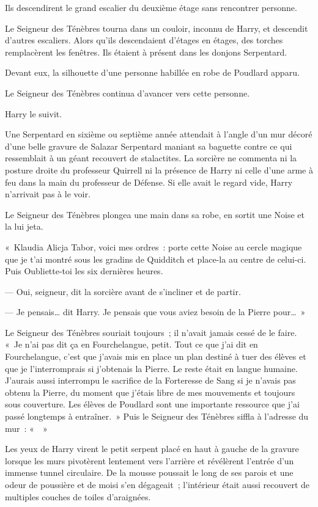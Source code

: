 Ils descendirent le grand escalier du deuxième étage sans rencontrer personne.

Le Seigneur des Ténèbres tourna dans un couloir, inconnu de Harry, et descendit d'autres escaliers.
Alors qu'ils descendaient d'étages en étages, des torches remplacèrent les fenêtres.
Ils étaient à présent dans les donjons Serpentard.

Devant eux, la silhouette d'une personne habillée en robe de Poudlard apparu.

Le Seigneur des Ténèbres continua d'avancer vers cette personne.

Harry le suivit.

Une Serpentard en sixième ou septième année attendait à l'angle d'un mur décoré d'une belle gravure de Salazar Serpentard maniant sa baguette contre ce qui ressemblait à un géant recouvert de stalactites.
La sorcière ne commenta ni la posture droite du professeur Quirrell ni la présence de Harry ni celle d'une arme à feu dans la main du professeur de Défense.
Si elle avait le regard vide, Harry n'arrivait pas à le voir.

Le Seigneur des Ténèbres plongea une main dans sa robe, en sortit une Noise et la lui jeta.

«~Klaudia Alicja Tabor, voici mes ordres~: porte cette Noise au cercle magique que je t'ai montré sous les gradins de Quidditch et place-la au centre de celui-ci.
Puis Oubliette-toi les six dernières heures.

--- Oui, seigneur, dit la sorcière avant de s'incliner et de partir.

--- Je pensais… dit Harry.
Je pensais que vous aviez besoin de la Pierre pour…~»

Le Seigneur des Ténèbres souriait toujours~; il n'avait jamais cessé de le faire.
«~Je n'ai pas dit ça en Fourchelangue, petit.
Tout ce que j'ai dit en Fourchelangue, c'est que j'avais mis en place un plan destiné à tuer des élèves et que je l'interromprais si j'obtenais la Pierre.
Le reste était en langue humaine.
J'aurais aussi interrompu le sacrifice de la Forteresse de Sang si je n'avais pas obtenu la Pierre, du moment que j'étais libre de mes mouvements et toujours sous couverture.
Les élèves de Poudlard sont une importante ressource que j'ai passé longtemps à entraîner.~»
Puis le Seigneur des Ténèbres siffla à l'adresse du mur~: «~~»

Les yeux de Harry virent le petit serpent placé en haut à gauche de la gravure lorsque les murs pivotèrent lentement vers l'arrière et révélèrent l'entrée d'un immense tunnel circulaire.
De la mousse poussait le long de ses parois et une odeur de poussière et de moisi s'en dégageait~; l'intérieur était aussi recouvert de multiples couches de toiles d'araignées.

